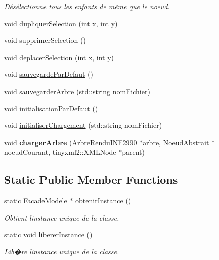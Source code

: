 \begin{DoxyCompactItemize}
\begin{DoxyCompactList}\small\item\em Désélectionne tous les enfants de même que le noeud. \end{DoxyCompactList}\item 
void \hyperlink{group__inf2990_gaeb73029786b508340552d920f690953f}{dupliquer\+Selection} (int x, int y)
\item 
void \hyperlink{group__inf2990_ga44bb2e40cdc87d4785d67e5a2dfabf77}{supprimer\+Selection} ()
\item 
void \hyperlink{group__inf2990_ga6dda34af65a0be1b2cc957865b678036}{deplacer\+Selection} (int x, int y)
\item 
void \hyperlink{group__inf2990_ga98b4ad1b668b2c2a56ebfb6a27f89ddd}{sauvegarde\+Par\+Defaut} ()
\item 
void \hyperlink{group__inf2990_ga8a9b90821b4affb5e5513de0ee52bb7b}{sauvegarder\+Arbre} (std\+::string nom\+Fichier)
\item 
void \hyperlink{group__inf2990_gaa6fff338318e965260de66f2dd8a92f5}{initialisation\+Par\+Defaut} ()
\item 
void \hyperlink{group__inf2990_ga75c207d1fd0d48c4eee89cac802e1f52}{initialiser\+Chargement} (std\+::string nom\+Fichier)
\item 
void {\bfseries charger\+Arbre} (\hyperlink{class_arbre_rendu_i_n_f2990}{Arbre\+Rendu\+I\+N\+F2990} $\ast$arbre, \hyperlink{class_noeud_abstrait}{Noeud\+Abstrait} $\ast$noeud\+Courant, tinyxml2\+::\+X\+M\+L\+Node $\ast$parent)
\end{DoxyCompactItemize}
\subsection*{Static Public Member Functions}
\begin{DoxyCompactItemize}
\item 
static \hyperlink{class_facade_modele}{Facade\+Modele} $\ast$ \hyperlink{group__inf2990_gaf52e6d65d1a911d3e1699fc30af97d38}{obtenir\+Instance} ()
\begin{DoxyCompactList}\small\item\em Obtient l\textquotesingle{}instance unique de la classe. \end{DoxyCompactList}\item 
static void \hyperlink{group__inf2990_gacbf0495fda26f5be37089470dc5f4372}{liberer\+Instance} ()
\begin{DoxyCompactList}\small\item\em Lib�re l\textquotesingle{}instance unique de la classe. \end{DoxyCompactList}\end{DoxyCompactItemize}


